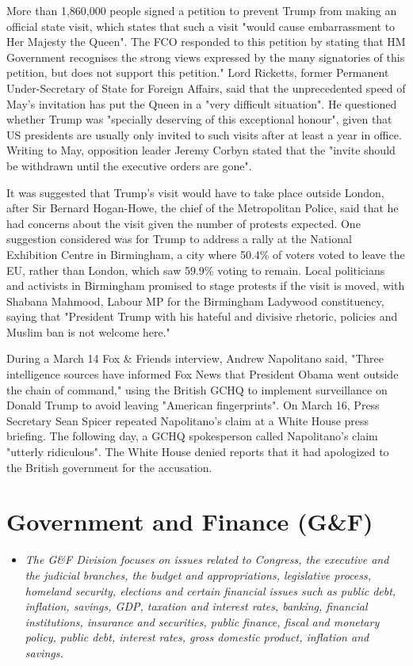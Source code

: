 More than 1,860,000 people signed a petition to prevent Trump from
making an official state visit, which states that such a visit "would
cause embarrassment to Her Majesty the Queen". The FCO responded to this
petition by stating that HM Government recognises the strong views
expressed by the many signatories of this petition, but does not support
this petition." Lord Ricketts, former Permanent Under-Secretary of State
for Foreign Affairs, said that the unprecedented speed of May's
invitation has put the Queen in a "very difficult situation". He
questioned whether Trump was "specially deserving of this exceptional
honour", given that US presidents are usually only invited to such
visits after at least a year in office. Writing to May, opposition
leader Jeremy Corbyn stated that the "invite should be withdrawn until
the executive orders are gone".

It was suggested that Trump's visit would have to take place outside
London, after Sir Bernard Hogan-Howe, the chief of the Metropolitan
Police, said that he had concerns about the visit given the number of
protests expected. One suggestion considered was for Trump to address a
rally at the National Exhibition Centre in Birmingham, a city where
50.4\% of voters voted to leave the EU, rather than London, which saw
59.9\% voting to remain. Local politicians and activists in Birmingham
promised to stage protests if the visit is moved, with Shabana Mahmood,
Labour MP for the Birmingham Ladywood constituency, saying that
"President Trump with his hateful and divisive rhetoric, policies and
Muslim ban is not welcome here."

During a March 14 Fox \& Friends interview, Andrew Napolitano said,
"Three intelligence sources have informed Fox News that President Obama
went outside the chain of command," using the British GCHQ to implement
surveillance on Donald Trump to avoid leaving "American fingerprints".
On March 16, Press Secretary Sean Spicer repeated Napolitano's claim at
a White House press briefing. The following day, a GCHQ spokesperson
called Napolitano's claim "utterly ridiculous". The White House denied
reports that it had apologized to the British government for the
accusation.

\section{Government and Finance (G\&F)}\label{government-and-finance-gf}

\begin{itemize}
\item
  \emph{The G\&F Division focuses on issues related to Congress, the
  executive and the judicial branches, the budget and appropriations,
  legislative process, homeland security, elections and certain
  financial issues such as public debt, inflation, savings, GDP,
  taxation and interest rates, banking, financial institutions,
  insurance and securities, public finance, fiscal and monetary policy,
  public debt, interest rates, gross domestic product, inflation and
  savings.}
\end{itemize}

